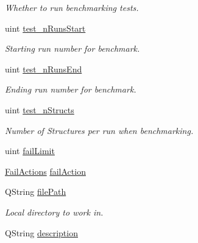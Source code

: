 \begin{DoxyCompactItemize}
\begin{DoxyCompactList}\small\item\em Whether to run benchmarking tests. \end{DoxyCompactList}\item 
\hypertarget{classGlobalSearch_1_1OptBase_a8d8902d09ca98a8f078182394bd1d7a1}{uint \hyperlink{classGlobalSearch_1_1OptBase_a8d8902d09ca98a8f078182394bd1d7a1}{test\-\_\-n\-Runs\-Start}}\label{classGlobalSearch_1_1OptBase_a8d8902d09ca98a8f078182394bd1d7a1}

\begin{DoxyCompactList}\small\item\em Starting run number for benchmark. \end{DoxyCompactList}\item 
\hypertarget{classGlobalSearch_1_1OptBase_a3433cbd854cbbb5d350e2ba7bb665c44}{uint \hyperlink{classGlobalSearch_1_1OptBase_a3433cbd854cbbb5d350e2ba7bb665c44}{test\-\_\-n\-Runs\-End}}\label{classGlobalSearch_1_1OptBase_a3433cbd854cbbb5d350e2ba7bb665c44}

\begin{DoxyCompactList}\small\item\em Ending run number for benchmark. \end{DoxyCompactList}\item 
\hypertarget{classGlobalSearch_1_1OptBase_a973157ab02d197102e5f67d80aacd706}{uint \hyperlink{classGlobalSearch_1_1OptBase_a973157ab02d197102e5f67d80aacd706}{test\-\_\-n\-Structs}}\label{classGlobalSearch_1_1OptBase_a973157ab02d197102e5f67d80aacd706}

\begin{DoxyCompactList}\small\item\em Number of Structures per run when benchmarking. \end{DoxyCompactList}\item 
uint \hyperlink{classGlobalSearch_1_1OptBase_aec8bb712a35c23ab79608a5d70f52b90}{fail\-Limit}
\item 
\hyperlink{classGlobalSearch_1_1OptBase_a970b328cd0a36335c34c6b24c6ac2775}{Fail\-Actions} \hyperlink{classGlobalSearch_1_1OptBase_adda17a1eab956c00c6b14ab3ae451b91}{fail\-Action}
\item 
\hypertarget{classGlobalSearch_1_1OptBase_a707d2bf2511d4fec3f244afb2f094c6e}{Q\-String \hyperlink{classGlobalSearch_1_1OptBase_a707d2bf2511d4fec3f244afb2f094c6e}{file\-Path}}\label{classGlobalSearch_1_1OptBase_a707d2bf2511d4fec3f244afb2f094c6e}

\begin{DoxyCompactList}\small\item\em Local directory to work in. \end{DoxyCompactList}\item 
\hypertarget{classGlobalSearch_1_1OptBase_ae7a73ff186f939f8fab1647a2dea6872}{Q\-String \hyperlink{classGlobalSearch_1_1OptBase_ae7a73ff186f939f8fab1647a2dea6872}{description}}\label{classGlobalSearch_1_1OptBase_ae7a73ff186f939f8fab1647a2dea6872}


\end{DoxyCompactItemize}

